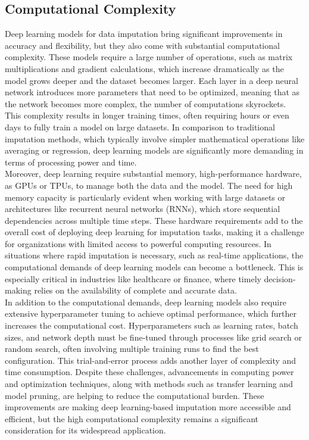 \documentclass{article}
\begin{document}
\subsection{Computational Complexity}
Deep learning models for data imputation bring significant improvements in accuracy and flexibility, but they also come with substantial computational complexity. These models require a large number of operations, such as matrix multiplications and gradient calculations, which increase dramatically as the model grows deeper and the dataset becomes larger. Each layer in a deep neural network introduces more parameters that need to be optimized, meaning that as the network becomes more complex, the number of computations skyrockets. This complexity results in longer training times, often requiring hours or even days to fully train a model on large datasets. In comparison to traditional imputation methods, which typically involve simpler mathematical operations like averaging or regression, deep learning models are significantly more demanding in terms of processing power and time.
\\
Moreover, deep learning require substantial memory, high-performance hardware, as GPUs or TPUs, to manage both the data and the model. The need for high memory capacity is particularly evident when working with large datasets or architectures like recurrent neural networks (RNNs), which store sequential dependencies across multiple time steps. These hardware requirements add to the overall cost of deploying deep learning for imputation tasks, making it a challenge for organizations with limited access to powerful computing resources. In situations where rapid imputation is necessary, such as real-time applications, the computational demands of deep learning models can become a bottleneck. This is especially critical in industries like healthcare or finance, where timely decision-making relies on the availability of complete and accurate data.
\\
In addition to the computational demands, deep learning models also require extensive hyperparameter tuning to achieve optimal performance, which further increases the computational cost. Hyperparameters such as learning rates, batch sizes, and network depth must be fine-tuned through processes like grid search or random search, often involving multiple training runs to find the best configuration. This trial-and-error process adds another layer of complexity and time consumption. Despite these challenges, advancements in computing power and optimization techniques, along with methods such as transfer learning and model pruning, are helping to reduce the computational burden. These improvements are making deep learning-based imputation more accessible and efficient, but the high computational complexity remains a significant consideration for its widespread application.
\pagebreak
\end{document}
